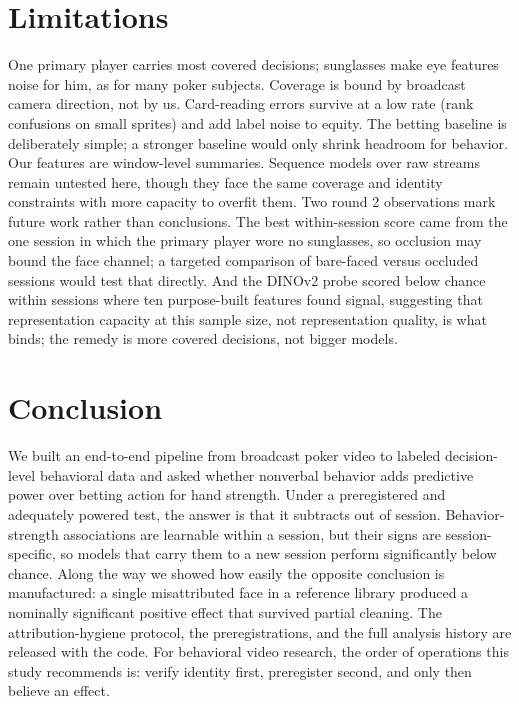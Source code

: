 \documentclass[conference]{IEEEtran}
\begin{document}
\section{Limitations}

One primary player carries most covered decisions; sunglasses make eye
features noise for him, as for many poker subjects. Coverage is bound by
broadcast camera direction, not by us. Card-reading errors survive at a
low rate (rank confusions on small sprites) and add label noise to equity.
The betting baseline is deliberately simple; a stronger baseline would
only shrink headroom for behavior. Our features are window-level
summaries. Sequence models over raw streams remain untested here, though
they face the same coverage and identity constraints with more capacity
to overfit them. Two round 2 observations mark future work rather than
conclusions. The best within-session score came from the one session in
which the primary player wore no sunglasses, so occlusion may bound the
face channel; a targeted comparison of bare-faced versus occluded
sessions would test that directly. And the DINOv2 probe scored below
chance within sessions where ten purpose-built features found signal,
suggesting that representation capacity at this sample size, not
representation quality, is what binds; the remedy is more covered
decisions, not bigger models.

\section{Conclusion}

We built an end-to-end pipeline from broadcast poker video to labeled
decision-level behavioral data and asked whether nonverbal behavior adds
predictive power over betting action for hand strength. Under a
preregistered and adequately powered test, the answer is that it
subtracts out of session. Behavior-strength associations are learnable
within a session, but their signs are session-specific, so models that
carry them to a new session perform significantly below chance. Along
the way we showed how easily the opposite conclusion is manufactured: a
single misattributed face in a reference library produced a nominally
significant positive effect that survived partial cleaning. The
attribution-hygiene protocol, the preregistrations, and the full
analysis history are released with the code. For behavioral video
research, the order of operations this study recommends is: verify
identity first, preregister second, and only then believe an effect.
\end{document}
